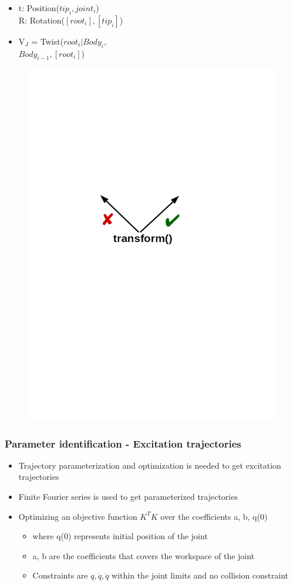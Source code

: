 \documentclass{beamer}
\begin{document}
\begin{frame}
\begin{minipage}{.45\textwidth}
\begin{itemize}
	\item t: Position($tip_i, joint_i$) \\ R: Rotation($[root_i], [tip_i]$)
	\item V$_J$ = Twist($root_i | Body_i,$ \\$Body_{i-1}, [root_i]$)
	\end{itemize}
\end{minipage}
\vspace{-1cm}
\begin{figure}[H]
	\includegraphics[trim=0 250 0 250,width=0.7\linewidth]{images/transform_kdl_featherstone}
\end{figure}
\end{frame}

\begin{frame}
	\frametitle{Parameter identification - Excitation trajectories}
	\begin{itemize}
	\item Trajectory parameterization and optimization is needed to get excitation trajectories~\cite{p6}
	\item Finite Fourier series is used to get parameterized trajectories
	\item Optimizing an objective function $K^TK$ over the coefficients a, b, q(0)
	\begin{itemize}
		\item where q(0) represents initial position of the joint
		\item a, b are the coefficients that covers the workspace of the joint
		\item Constraints are $q, \dot{q}, \ddot{q}$ within the joint limits and no collision constraint
	\end{itemize}
	\end{itemize}
\end{frame}
\end{document}
